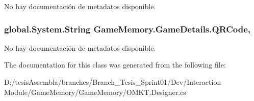 No hay documentación de metadatos disponible. 

\hypertarget{class_game_memory_1_1_game_details_ae5cc5d9b422f78685cd588225e4036ac}{
\subsubsection[{Q\-R\-Code}]{\setlength{\rightskip}{0pt plus 5cm}global.\-System.\-String Game\-Memory.\-Game\-Details.\-Q\-R\-Code\hspace{0.3cm}{\ttfamily [get]}, {\ttfamily [set]}}}\label{class_game_memory_1_1_game_details_ae5cc5d9b422f78685cd588225e4036ac}


No hay documentación de metadatos disponible. 



The documentation for this class was generated from the following file\-:\begin{DoxyCompactItemize}
\item 
D\-:/tesis\-Assembla/branches/\-Branch\-\_\-\-Tesis\-\_\-\-Sprint01/\-Dev/\-Interaction Module/\-Game\-Memory/\-Game\-Memory/O\-M\-K\-T.\-Designer.\-cs\end{DoxyCompactItemize}

